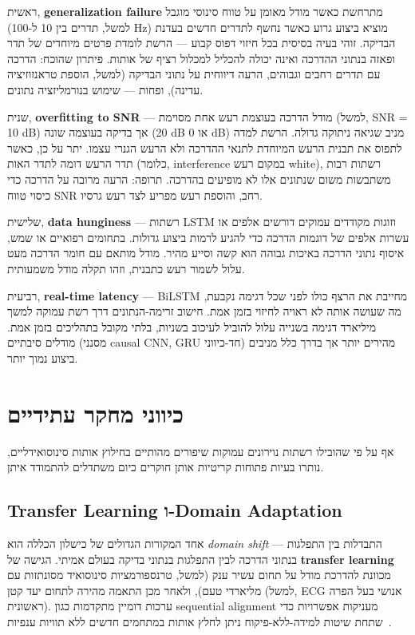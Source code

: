 ראשית, \textbf{generalization failure} מתרחשת כאשר מודל מאומן על טווח סינוסי מוגבל (למשל, תדרים בין 10 ל-100 Hz) מוציא ביצוע גרוע כאשר נחשף לתדרים חדשים בעדנת הבדיקה. זוהי בעיה בסיסית בכל חיזוי דפוס קבוע --- הרשת לומדת פרטים מיוחדים של תדר ופאזה בנתוני ההדרכה ואינה יכולה להכליל למכלול רציף של אותות. פיתרון שהוכח: הדרכה עם תדרים רחבים וגבוהים, הרעה דיווחית על נתוני הבדיקה (למשל, הוספת טראנזוזיציה עדינה), ופחות --- שימוש בנורמליזציה נתונים.

שנית, \textbf{overfitting to SNR} --- מודל הדרכה בעוצמת רעש אחת מסוימת (למשל, \textenglish{SNR} = 10 dB) אך בדיקה בעוצמה שונה (20 dB או 0 dB) מניב שגיאה ניתוקה גדולה. הרשת למדה לתפוס את תבנית הרעש המיוחדת לתנאי ההדרכה ולא הרעש הגנרי עצמו. יתר על כן, כאשר תדר הרעש דומה לתדר האות (כלומר, \textenglish{interference} במקום רעש \textenglish{white}), רשתות רבות משתבשות משום שנתונים אלו לא מופיעים בהדרכה. תרופה: הרעה מרובה על הדרכה כדי כיסוי טווח \textenglish{SNR} רחב, והוספת רעש מפריע לצד רעש גרסיו.

שלישית, \textbf{data hunginess} --- רשתות \textenglish{LSTM} וזוגות מקודדים עמוקים דורשים אלפים או עשרות אלפים של דוגמות הדרכה כדי להגיע לרמות ביצוע גדולות. בתחומים רפואיים או שמש, איסוף נתוני הדרכה באיכות גבוהה הוא קשה וסייע מהיר. מודל מותאם עם חומר הדרכה מעט עלול לשמור רעש כתבנית, וזהו תקלה מודל משמעותית.

רביעית, \textbf{real-time latency} --- \textenglish{BiLSTM} מחייבת את הרצף כולו לפני שכל דגימה נקבעת, מה שעושה אותה לא ראויה לחיזוי בזמן אמת. חישוב זרימה-הנתונים דרך רשת עמוקה למשך מיליארד דגימה בשנייה עלול להוביל לעיכוב בשניות, בלתי מקובל בתהליכים בזמן אמת. מודלים סיבתיים (מסנני \textenglish{causal CNN}, \textenglish{GRU} חד-כיווני) מהירים יותר אך בדרך כלל מניבים ביצוע נמוך יותר.

\section{כיווני מחקר עתידיים}

אף על פי שהובילו רשתות נוירונים עמוקות שיפורים מהותיים בחילוץ אותות סינוסואידליים, נותרו בעיות פתוחות קריטיות אותן חוקרים כיום משתדלים להתמודד איתן.

\subsection{Transfer Learning ו-Domain Adaptation}

אחד המקורות הגדולים של כישלון הכללה הוא \textit{domain shift} --- התבדלות בין התפלגות בנתוני הדרכה לבין התפלגות בנתוני בדיקה בעולם אמיתי. הגישה של \textbf{transfer learning} מכוונת להדרכת מודל על תחום עשיר ענק (למשל, טרנספורמציות סינוסואיד מסונתזות עם מליארדי טעם), ולאחר מכן התאמה מהירה לתחום יעד קטן (למשל, \textenglish{ECG} אנושי בעל הפרה ראשונית). ערכות דומיין מתקדמות כגון \textenglish{sequential alignment} מעניקות אפשרויות כדי שתחת שיטות למידה-ללא-פיקוח ניתן לחלץ אותות במתחמים חדשים ללא תוויות ענפיות~\cite{brown2020language}.

